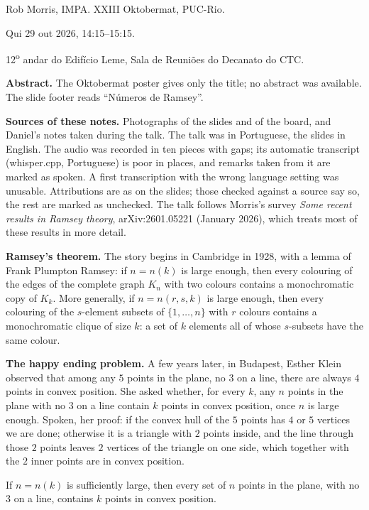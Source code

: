 \noindent
Rob Morris, IMPA.
XXIII Oktobermat, PUC-Rio.

Qui 29 out 2026, 14:15--15:15.

12\textsuperscript{o} andar do Edif\'icio
Leme, Sala de Reuni\~oes do Decanato do CTC.

\medskip\noindent
{\bf Abstract.} The Oktobermat poster gives
only the title; no abstract was available.
The slide footer reads ``N\'umeros de
Ramsey''.

\medskip\noindent
{\bf Sources of these notes.} Photographs of
the slides and of the board, and Daniel's
notes taken during the talk. The talk was in
Portuguese, the slides in English. The audio
was recorded in ten pieces with gaps; its
automatic transcript (whisper.cpp,
Portuguese) is poor in places, and remarks
taken from it are marked as spoken. A first
transcription with the wrong language setting
was unusable. Attributions are as
on the slides; those checked against a
source say so, the rest are marked as
unchecked. The talk follows Morris's survey
\emph{Some recent results in Ramsey theory},
arXiv:2601.05221 (January 2026), which treats
most of these results in more detail.

\medskip\noindent
{\bf Ramsey's theorem.} The story begins in
Cambridge in 1928, with a lemma of Frank
Plumpton Ramsey: if $n = n(k)$ is large
enough, then every colouring of the edges of
the complete graph $K_n$ with two colours
contains a monochromatic copy of $K_k$. More
generally, if $n = n(r,s,k)$ is large enough,
then every colouring of the $s$-element
subsets of $\{1,\ldots,n\}$ with $r$ colours
contains a monochromatic clique of size $k$:
a set of $k$ elements all of whose
$s$-subsets
have the same colour.

\medskip\noindent
{\bf The happy ending problem.} A few years
later, in Budapest, Esther Klein observed
that among any $5$ points in the plane, no
$3$ on a line, there are always $4$ points in
convex position. She asked whether, for every
$k$, any $n$ points in the plane with no $3$
on a line contain $k$ points in convex
position, once $n$ is large enough.
Spoken, her proof: if the convex hull of the
$5$ points has $4$ or $5$ vertices we are
done; otherwise it is a triangle with $2$
points inside, and the line through those
$2$ points leaves $2$ vertices of the
triangle on one side, which together with
the $2$ inner points are in convex
position.

\begin{theorem}
\label{theorem-happy-ending}
If $n = n(k)$ is sufficiently large, then
every set of $n$ points in the plane, with no
$3$ on a line, contains $k$ points in convex
position.
\end{theorem}

